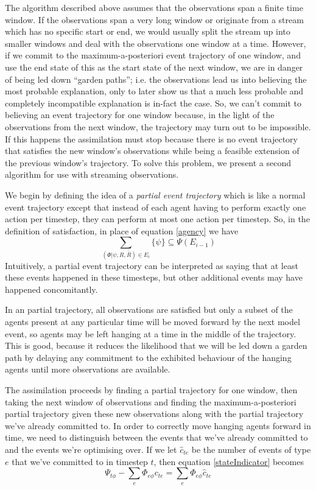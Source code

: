 \documentclass{article}
\begin{document}
The algorithm described above assumes that the observations span a finite time window. If the observations span a very long window or originate from a stream which has no specific start or end, we would usually split the stream up into smaller windows and deal with the observations one window at a time. However, if we commit to the maximum-a-posteriori event trajectory of one window, and use the end state of this as the start state of the next window, we are in danger of being led down ``garden paths''; i.e. the observations lead us into believing the most probable explanation, only to later show us that a much less probable and completely incompatible explanation is in-fact the case. So, we can't commit to believing an event trajectory for one window because, in the light of the observations from the next window, the trajectory may turn out to be impossible. If this happens the assimilation must stop because there is no event trajectory that satisfies the new window's observations while being a feasible extension of the previous window's trajectory. To solve this problem, we present a second algorithm for use with streaming observations.

We begin by defining the idea of a \textit{partial event trajectory} which is like a normal event trajectory except that instead of each agent having to perform exactly one action per timestep, they can perform at most one action per timestep. So, in the definition of satisfaction, in place of equation \ref{agency} we have
\begin{equation}
\sum_{(\Phi|\psi,R,\bar{R})\in E_i}\{\psi\} \subseteq \Psi(E_{i-1})
\end{equation}
Intuitively, a partial event trajectory can be interpreted as saying that at least these events happened in these timesteps, but other additional events may have happened concomitantly.

In an partial trajectory, all observations are satisfied but only a subset of the agents present at any particular time will be moved forward by the next model event, so agents may be left hanging at a time in the middle of the trajectory. This is good, because it reduces the likelihood that we will be led down a garden path by delaying any commitment to the exhibited behaviour of the hanging agents until more observations are available.

The assimilation proceeds by finding a partial trajectory for one window, then taking the next window of observations and finding the maximum-a-posteriori partial trajectory given these new observations along with the partial trajectory we've already committed to. In order to correctly move hanging agents forward in time, we need to distinguish between the events that we've already committed to and the events we're optimising over. If we let $\hat{c}_{te}$ be the number of events of type $e$ that we've committed to in timestep $t$, then equation \ref{stateIndicator} becomes
\begin{equation}
\Psi_{t\phi} -  \sum_e\Phi_{e\phi}c_{te} = \sum_e\Phi_{e\phi}\hat{c}_{te}
\label{stateIndicator}
\end{equation}
\end{document}
